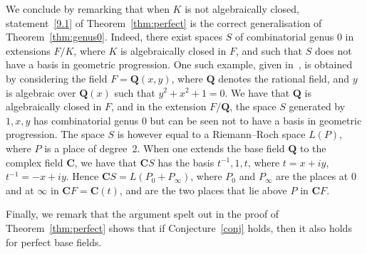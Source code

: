 \documentclass[ALCO,Unicode,ThmDefs]{cedram}
\newcommand*\Q{{\mathbf Q}}
\renewcommand*\C{{\mathbf C}}
\begin{document}
We conclude by remarking that when $K$ is not algebraically closed, statement~\eqref{9.1} of Theorem~\ref{thm:perfect} is the correct generalisation of Theorem~\ref{thm:genus0}. Indeed, there exist spaces $S$ of combinatorial genus $0$ in extensions $F/K$, where $K$ is algebraically closed in $F$, and such that $S$ does not have a basis in geometric progression. One such example, given in~\cite{bszVosper}, is obtained by considering the field $F=\Q(x,y)$, where $\Q$ denotes the rational field, and $y$ is algebraic over $\Q(x)$ such that $y^2+x^2+1=0$. We have that $\Q$ is algebraically closed in $F$, and in the extension $F/\Q$, the space $S$ generated by $1,x,y$ has combinatorial genus $0$ but can be seen not to have a basis in geometric progression. The space $S$ is however equal to a Riemann--Roch space $L(P)$, where $P$ is a place of degree~$2$. When one extends the base field $\Q$ to the complex field $\C$, we have that $\C S$ has the basis $t^{-1},1,t$, where $t=x+iy$,$t^{-1}=-x+iy$. Hence $\C S= L(P_0+P_{\infty})$, where $P_0$ and $P_\infty$ are the places at $0$ and at $\infty$ in $\C F=\C(t)$, and are the two places that lie above $P$ in $\C F$.

Finally, we remark that the argument spelt out in the proof of Theorem~\ref{thm:perfect} shows that if Conjecture~\ref{conj} holds, then it also holds for perfect base fields.



\end{document}
